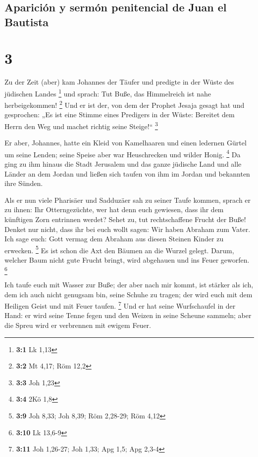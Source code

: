 \hypertarget{apariciuxf3n-y-sermuxf3n-penitencial-de-juan-el-bautista}{%
\subsection{Aparición y sermón penitencial de Juan el
Bautista}\label{apariciuxf3n-y-sermuxf3n-penitencial-de-juan-el-bautista}}

\hypertarget{section-2}{%
\section{3}\label{section-2}}

 Zu der Zeit (aber) kam Johannes der Täufer und predigte
in der Wüste des jüdischen Landes \footnote{\textbf{3:1} Lk 1,13}
 und sprach: Tut Buße, das Himmelreich ist nahe
herbeigekommen! \footnote{\textbf{3:2} Mt 4,17; Röm 12,2} 
Und er ist der, von dem der Prophet Jesaja gesagt hat und gesprochen:
„Es ist eine Stimme eines Predigers in der Wüste: Bereitet dem Herrn den
Weg und machet richtig seine Steige!{}`` \footnote{\textbf{3:3} Joh 1,23}

 Er aber, Johannes, hatte ein Kleid von Kamelhaaren und
einen ledernen Gürtel um seine Lenden; seine Speise aber war
Heuschrecken und wilder Honig. \footnote{\textbf{3:4} 2Kö 1,8}
 Da ging zu ihm hinaus die Stadt Jerusalem und das ganze
jüdische Land und alle Länder an dem Jordan  und ließen
sich taufen von ihm im Jordan und bekannten ihre Sünden.

 Als er nun viele Pharisäer und Sadduzäer sah zu seiner
Taufe kommen, sprach er zu ihnen: Ihr Otterngezüchte, wer hat denn euch
gewiesen, dass ihr dem künftigen Zorn entrinnen werdet? 
Sehet zu, tut rechtschaffene Frucht der Buße!  Denket nur
nicht, dass ihr bei euch wollt sagen: Wir haben Abraham zum Vater. Ich
sage euch: Gott vermag dem Abraham aus diesen Steinen Kinder zu
erwecken. \footnote{\textbf{3:9} Joh 8,33; Joh 8,39; Röm 2,28-29; Röm
  4,12}  Es ist schon die Axt den Bäumen an die Wurzel
gelegt. Darum, welcher Baum nicht gute Frucht bringt, wird abgehauen und
ins Feuer geworfen. \footnote{\textbf{3:10} Lk 13,6-9}

 Ich taufe euch mit Wasser zur Buße; der aber nach mir
kommt, ist stärker als ich, dem ich auch nicht genugsam bin, seine
Schuhe zu tragen; der wird euch mit dem Heiligen Geist und mit Feuer
taufen. \footnote{\textbf{3:11} Joh 1,26-27; Joh 1,33; Apg 1,5; Apg
  2,3-4}  Und er hat seine Wurfschaufel in der Hand: er
wird seine Tenne fegen und den Weizen in seine Scheune sammeln; aber die
Spreu wird er verbrennen mit ewigem Feuer.

